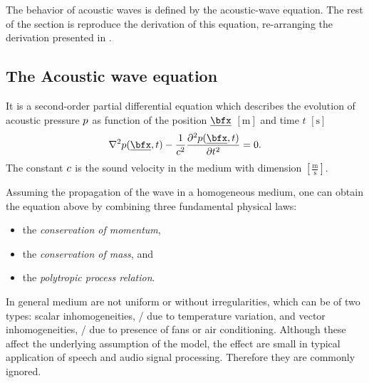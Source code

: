 The behavior of acoustic waves is defined by the acoustic-wave equation.
The rest of the section is reproduce the derivation of this equation, re-arranging the derivation presented in \cite{kuttruff2016room, pierce2019acoustics, marczuk2006modelling, avanzini2019sound}.

\subsection{The Acoustic wave equation}\label{subsec:acoustics:waveq}
It is a second-order partial differential equation
 which describes the evolution of acoustic pressure $p$
as function of the position $\positionMicrophone$ $[\si{\metre}]$ and time $t$ $[\si{\second}]$
\begin{equation}
    \label{eq:acoustics:wave}
    \knabla^2 \pressureSpaceTime - \frac{1}{\speedOfSound^2} \kpderiv[2]{\pressureSpaceTime}{t} = 0
    .
\end{equation}
The constant $c$ is the sound velocity in the medium with dimension $[\frac{\si{\metre}}{\si{\second}}]$.

Assuming the propagation of the wave in a homogeneous medium, one can obtain the equation above by combining three fundamental physical laws:
\begin{itemize}
    \item the \textit{conservation of momentum},
    \item the \textit{conservation of mass}, and
    \item the \textit{polytropic process relation}.
\end{itemize}

In general medium are not uniform or without irregularities, which can be of two types:
scalar inhomogeneities, \eg/ due to temperature variation,
and vector inhomogeneities, \eg/ due to presence of fans or air conditioning.
Although these affect the underlying assumption of the model, the effect are small in typical application of speech and audio signal processing.
Therefore they are commonly ignored.

